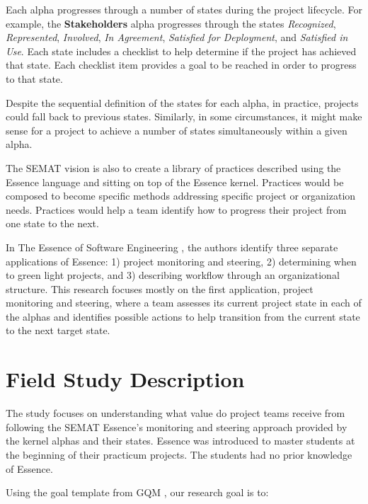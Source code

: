 Each alpha progresses through a number of states during the project lifecycle. For example, the \textbf{Stakeholders} alpha progresses through the states \textit{Recognized}, \textit{Represented}, \textit{Involved}, \textit{In Agreement}, \textit{Satisfied for Deployment}, and \textit{Satisfied in Use}. Each state includes a checklist to help determine if the project has achieved that state. Each checklist item provides a goal to be reached in order to progress to that state.

Despite the sequential definition of the states for each alpha, in practice, projects could fall back to previous states. Similarly, in some circumstances, it might make sense for a project to achieve a number of states simultaneously within a given alpha.

The SEMAT vision is also to create a library of practices described using the Essence language and sitting on top of the Essence kernel. Practices would be composed to become specific methods addressing specific project or organization needs. Practices would help a team identify how to progress their project from one state to the next.

In The Essence of Software Engineering \cite{EssenceBook}, the authors identify three separate applications of Essence: 1) project monitoring and steering, 2) determining when to green light projects, and 3) describing workflow through an organizational structure. This research focuses mostly on the first application, project monitoring and steering, where a team assesses its current project state in each of the alphas and identifies possible actions to help transition from the current state to the next target state.

\section{Field Study Description}
\label{Field Study Description}

The study focuses on understanding what value do project teams receive from following the SEMAT Essence's monitoring and steering approach provided by the kernel alphas and their states. Essence was introduced to master students at the beginning of their practicum projects. The students had no prior knowledge of Essence.

Using the goal template from GQM \cite{GQM}, our research goal is to:

